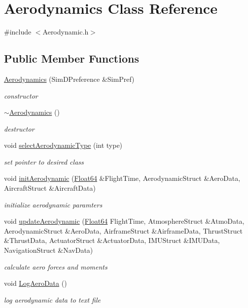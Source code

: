 \hypertarget{class_aerodynamics}{}\section{Aerodynamics Class Reference}
\label{class_aerodynamics}


{\ttfamily \#include $<$Aerodynamic.\+h$>$}

\subsection*{Public Member Functions}
\begin{DoxyCompactItemize}
\item 
\hyperlink{class_aerodynamics_af0582a3e010d9614ace4b96f31fc2a8d}{Aerodynamics} (Sim\+D\+Preference \&Sim\+Pref)
\begin{DoxyCompactList}\small\item\em constructor \end{DoxyCompactList}\item 
\hyperlink{class_aerodynamics_af0e048e0c80ec8334997b79b761fea60}{$\sim$\+Aerodynamics} ()
\begin{DoxyCompactList}\small\item\em destructor \end{DoxyCompactList}\item 
void \hyperlink{class_aerodynamics_a9aa3397e8b1d91ed237146a57bbe6bcf}{select\+Aerodynamic\+Type} (int type)
\begin{DoxyCompactList}\small\item\em set pointer to desired class \end{DoxyCompactList}\item 
void \hyperlink{class_aerodynamics_a9970a48140e0d956f6e0cc5f6d5cda33}{init\+Aerodynamic} (\hyperlink{group___tools_ga3f1431cb9f76da10f59246d1d743dc2c}{Float64} \&Flight\+Time, Aerodynamic\+Struct \&Aero\+Data, Aircraft\+Struct \&Aircraft\+Data)
\begin{DoxyCompactList}\small\item\em initialize aerodynamic paramters \end{DoxyCompactList}\item 
void \hyperlink{class_aerodynamics_a83f9967d09e40e6c53dd17815f6bb096}{update\+Aerodynamic} (\hyperlink{group___tools_ga3f1431cb9f76da10f59246d1d743dc2c}{Float64} Flight\+Time, Atmosphere\+Struct \&Atmo\+Data, Aerodynamic\+Struct \&Aero\+Data, Airframe\+Struct \&Airframe\+Data, Thrust\+Struct \&Thrust\+Data, Actuator\+Struct \&Actuator\+Data, I\+M\+U\+Struct \&I\+M\+U\+Data, Navigation\+Struct \&Nav\+Data)
\begin{DoxyCompactList}\small\item\em calculate aero forces and moments \end{DoxyCompactList}\item 
void \hyperlink{class_aerodynamics_aa7af099a965b08deb4e86753149522e9}{Log\+Aero\+Data} ()
\begin{DoxyCompactList}\small\item\em log aerodynamic data to text file \end{DoxyCompactList}\end{DoxyCompactItemize}



